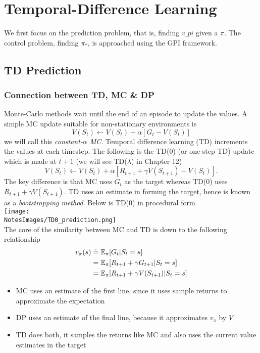 \section{Temporal-Difference Learning}
We first focus on the prediction problem, that is, finding $v\_pi$ given a $\pi$. The control problem, finding $\pi_*$, is approached using the GPI framework.

\subsection{TD Prediction}

\subsubsection*{Connection between TD, MC \& DP}
Monte-Carlo methods wait until the end of an episode to update the values. A simple MC update suitable for non-stationary environments is
\begin{equation}
    V(S_t) \leftarrow V(S_t) + \alpha [G_t - V(S_t)]
\end{equation}
we will call this \emph{constant-$\alpha$ MC}. Temporal difference learning (TD) increments the values at each timestep. The following is the TD(0) (or one-step TD) update which is made at $t+1$ (we will see TD($\lambda$) in Chapter 12)
\begin{equation}
    V(S_t) \leftarrow V(S_t) + \alpha [R_{t+1} + \gamma V(S_{t+1}) - V(S_t)].
\end{equation}
The key difference is that MC uses $G_t$ as the target whereas TD(0) uses $R_{t+1} + \gamma V(S_{t+1})$. TD uses an estimate in forming the target, hence is known as a \emph{bootstrapping method}. Below is TD(0) in procedural form. \\

\texttt{[image: \\NotesImages/TD0\_prediction.png]} \\

The core of the similarity between MC and TD is down to the following relationship
\begin{align}
    v_\pi(s) &\doteq \mathbb{E}_{\pi}{}[G_t|S_t = s]\\
             &= \mathbb{E}_{\pi}{}[R_{t+1} + \gamma G_{t+1}|S_t = s]\\
             &= \mathbb{E}_{\pi}{}[R_{t+1} + \gamma V(S_{t+1})|S_t = s]
\end{align}

\begin{itemize}
    \item MC uses an estimate of the first line, since it uses sample returns to approximate the expectation
    \item DP uses an estimate of the final line, because it approximates $v_\pi$ by $V$
    \item TD does both, it samples the returns like MC and also uses the current value estimates in the target
\end{itemize}

